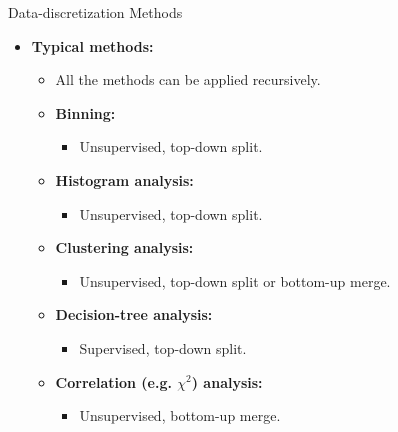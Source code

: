 \begin{frame}{Data-discretization Methods}
	\begin{itemize}
		\item \textbf{Typical methods:}
		      \begin{itemize}
			      \item All the methods can be applied recursively.
			      \item \textbf{Binning:}
			            \begin{itemize}
				            \item Unsupervised, top-down split.
			            \end{itemize}
			      \item \textbf{Histogram analysis:}
			            \begin{itemize}
				            \item Unsupervised, top-down split.
			            \end{itemize}
			      \item \textbf{Clustering analysis:}
			            \begin{itemize}
				            \item Unsupervised, top-down split or bottom-up merge.
			            \end{itemize}
			      \item \textbf{Decision-tree analysis:}
			            \begin{itemize}
				            \item Supervised, top-down split.
			            \end{itemize}
			      \item \textbf{Correlation (e.g. $\chi^2$) analysis:}
			            \begin{itemize}
				            \item Unsupervised, bottom-up merge.
			            \end{itemize}
		      \end{itemize}
	\end{itemize}
\end{frame}

